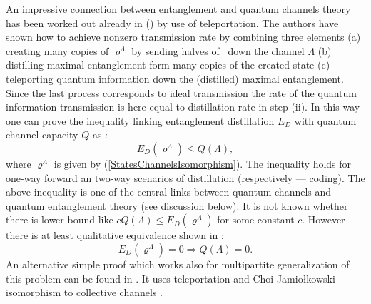 \documentclass[twocolumn,aps,rmp]{revtex4}
\begin{document}
An impressive connection between entanglement
and quantum channels theory  has been worked out already
in (\cite{BBPSSW1996,BDSW1996}) by use of teleportation.
The authors have shown how to achieve nonzero
transmission rate by combining three elements (a) creating many
copies of $\varrho^{\Lambda}$ by sending halves of \singlets\ down the channel
$\Lambda$ (b) distilling maximal entanglement
form many copies of the created state (c) teleporting quantum
information down the (distilled) maximal entanglement. Since the
last process corresponds to ideal transmission the rate of the
quantum information transmission is here equal to
distillation rate in step (ii). In this way one can prove the
inequality linking entanglement distillation $E_{D}$ with quantum
channel capacity $Q$ as \cite{BDSW1996}:
\begin{equation}
E_{D}(\varrho^{\Lambda}) \leq Q(\Lambda), \label{DQIneq}
\end{equation}
where $\varrho^\Lambda $  is given by (\ref{StatesChannelsIsomorphism}).
The inequality holds for one-way forward an two-way scenarios of
distillation (respectively --- coding). The above
inequality is one of the central links between quantum channels and
quantum entanglement theory (see discussion below). It is not known
whether there is lower bound like $cQ(\Lambda)\leq
E_{D}(\varrho^{\Lambda})$ for some constant $c$. However there is at
least qualitative equivalence shown in \cite{PHCEJP}:
\begin{equation} E_{D}(\varrho^{\Lambda})=0
\Rightarrow   Q(\Lambda)=0. \label{DQqualitequiv}
\end{equation}
An alternative simple proof which works also for multipartite
generalization of this problem can be found
in \cite{DuHoCi04}. It uses teleportation and Choi-Jamio\l{}kowski
isomorphism to collective channels \cite{CiDuKraLe01}.
\end{document}
